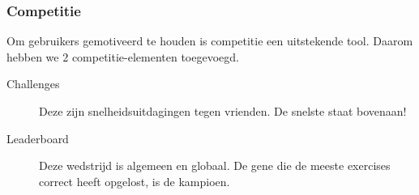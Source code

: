 \subsubsection{Competitie}
Om gebruikers gemotiveerd te houden is competitie een uitstekende tool. Daarom hebben we 2 competitie-elementen toegevoegd.
\begin{description}
    \item[Challenges] Deze zijn snelheidsuitdagingen tegen vrienden. De snelste staat bovenaan!
    \item[Leaderboard] Deze wedstrijd is algemeen en globaal. De gene die de meeste exercises correct heeft opgelost, is de kampioen.
\end{description}
